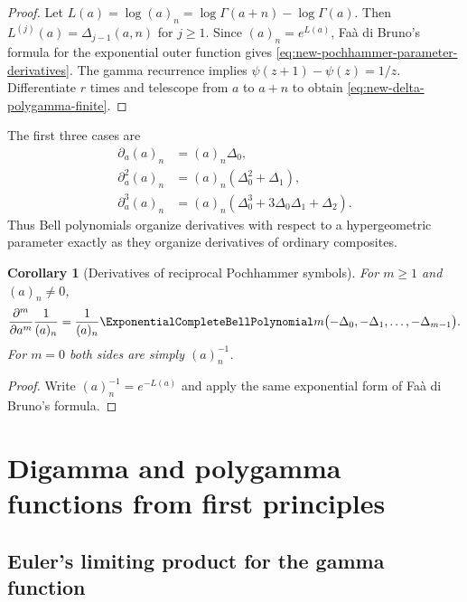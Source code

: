 \documentclass[11pt,a4paper,oneside,openany]{book}
\newtheorem{corollary}[theorem]{Corollary}
\theoremstyle{definition}
\theoremstyle{remark}
\begin{document}
\begin{proof}
Let $L(a)=\log(a)_n=\log\Gamma(a+n)-\log\Gamma(a)$.  Then
$L^{(j)}(a)=\Delta_{j-1}(a,n)$ for $j\ge1$.  Since $(a)_n=e^{L(a)}$,
Faà di Bruno's formula for the exponential outer function gives
\eqref{eq:new-pochhammer-parameter-derivatives}.  The gamma recurrence implies
$\psi(z+1)-\psi(z)=1/z$.  Differentiate $r$ times and telescope from $a$ to
$a+n$ to obtain \eqref{eq:new-delta-polygamma-finite}.
\end{proof}

The first three cases are
\begin{align}
 \partial_a(a)_n
 &=(a)_n\Delta_0,
 \label{eq:new-pochhammer-first-derivative}\\
 \partial_a^2(a)_n
 &=(a)_n(\Delta_0^2+\Delta_1),
 \label{eq:new-pochhammer-second-derivative}\\
 \partial_a^3(a)_n
 &=(a)_n(\Delta_0^3+3\Delta_0\Delta_1+\Delta_2).
 \label{eq:new-pochhammer-third-derivative}
\end{align}
Thus Bell polynomials organize derivatives with respect to a hypergeometric
parameter exactly as they organize derivatives of ordinary composites.

\begin{corollary}[Derivatives of reciprocal Pochhammer symbols]
\label{cor:new-reciprocal-pochhammer}
For $m\ge1$ and $(a)_n\ne0$,
\begin{equation}\label{eq:new-reciprocal-pochhammer}
 \frac{\partial^m}{\partial a^m}\frac1{(a)_n}
 =\frac1{(a)_n}\ExponentialCompleteBellPolynomial m
 \bigl(-\Delta_0,-\Delta_1,\ldots,-\Delta_{m-1}\bigr).
\end{equation}
For $m=0$ both sides are simply $(a)_n^{-1}$.
\end{corollary}

\begin{proof}
Write $(a)_n^{-1}=e^{-L(a)}$ and apply the same exponential form of
Faà di Bruno's formula.
\end{proof}

\chapter{Digamma and polygamma functions from first principles}
\label{ch:polygamma}

\section{Euler's limiting product for the gamma function}
\end{document}
